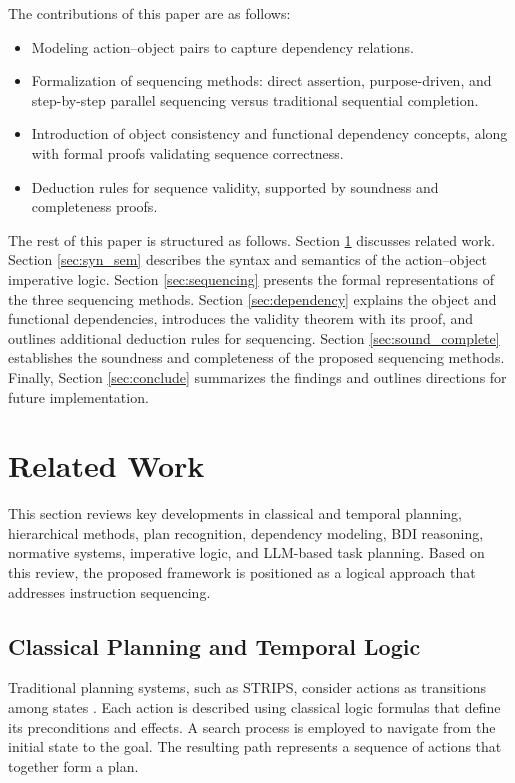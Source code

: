 \documentclass[a4paper,11pt]{lmcs}
\begin{document}
The contributions of this paper are as follows:
\begin{itemize}
\item Modeling action–object pairs to capture dependency relations.
\item Formalization of sequencing methods: direct assertion, purpose-driven, and step-by-step parallel sequencing versus traditional sequential completion.
\item Introduction of object consistency and functional dependency concepts, along with formal proofs validating sequence correctness.
\item Deduction rules for sequence validity, supported by soundness and completeness proofs.
\end{itemize}

The rest of this paper is structured as follows. Section \ref{sec:related} discusses related work. Section \ref{sec:syn_sem} describes the syntax and semantics of the action–object imperative logic. Section \ref{sec:sequencing} presents the formal representations of the three sequencing methods. Section \ref{sec:dependency} explains the object and functional dependencies, introduces the validity theorem with its proof, and outlines additional deduction rules for sequencing. Section \ref{sec:sound_complete} establishes the soundness and completeness of the proposed sequencing methods. Finally, Section \ref{sec:conclude} summarizes the findings and outlines directions for future implementation.

\section{Related Work}
\label{sec:related}
This section reviews key developments in classical and temporal planning, hierarchical methods, plan recognition, dependency modeling, BDI reasoning, normative systems, imperative logic, and LLM-based task planning. Based on this review, the proposed framework is positioned as a logical approach that addresses instruction sequencing.

\subsection*{Classical Planning and Temporal Logic}
Traditional planning systems, such as STRIPS, consider actions as transitions among states \citep{strips}. Each action is described using classical logic formulas that define its preconditions and effects. A search process is employed to navigate from the initial state to the goal. The resulting path represents a sequence of actions that together form a plan.
\end{document}
